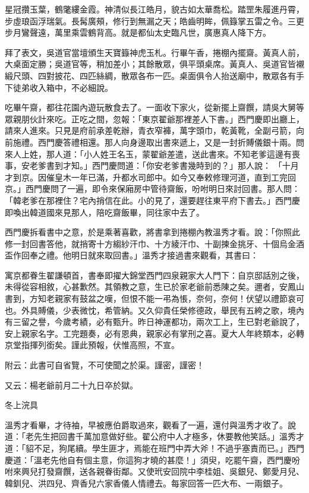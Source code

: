 星冠攢玉葉，鶴氅縷金霞。神清似長江皓月，貌古如太華喬松。踏罡朱履進丹霄，步虛琅函浮瑞氣。長髯廣頰，修行到無漏之天；皓齒明眸，佩籙掌五雷之令。三更步月鸞聲遠，萬里乘雲鶴背高。就是都仙太史臨凡世，廣惠真人降下方。

拜了表文，吳道官當壇頒生天寶籙神虎玉札。行畢午香，捲棚內擺齋。黃真人前，大桌面定勝；吳道官等，稍加差小；其餘散眾，俱平頭桌席。黃真人、吳道官皆襯緞尺頭、四對披花、四匹絲綢，散眾各布一匹。桌面俱令人抬送廟中，散眾各有手下徒弟收入箱中，不必細說。

吃畢午齋，都往花園內遊玩散食去了。一面收下家火，從新擺上齋饌，請吳大舅等眾親朋伙計來吃。正吃之間，忽報：「東京翟爺那裡差人下書。」西門慶即出廳上，請來人進來。只見是府前承差乾辦，青衣窄褲，萬字頭巾，乾黃靴，全副弓箭，向前施禮。西門慶答禮相還。那人向身邊取出書來遞上，又是一封折賻儀銀十兩。問來人上姓，那人道：「小人姓王名玉，蒙翟爺差遣，送此書來。不知老爹這邊有喪事，安老爹書到才知。」西門慶問道：「你安老爹書幾時到的？」那人說： 「十月才到京。因催皇木一年已滿，升都水司郎中。如今又奉敕修理河道，直到工完回京。」西門慶問了一遍，即令來保廂房中管待齋飯，吩咐明日來討回書。那人問：「韓老爹在那裡住？宅內捎信在此。小的見了，還要趕往東平府下書去。」西門慶即喚出韓道國來見那人，陪吃齋飯畢，同往家中去了。

西門慶拆看書中之意，於是乘著喜歡，將書拿到捲棚內教溫秀才看。說：「你照此修一封回書答他，就捎寄十方縐紗汗巾、十方綾汗巾、十副揀金挑牙、十個烏金酒盃作回奉之禮。他明日就來取回書。」溫秀才接過書來觀看，其書曰：

寓京都眷生翟謙頓首，書奉即擢大錦堂西門四泉親家大人門下：自京邸話別之後，未得從容相敘，心甚歉然。其領教之意，生已於家老爺前悉陳之矣。邇者，安鳳山書到，方知老親家有鼓盆之嘆，但恨不能一弔為悵，奈何，奈何！伏望以禮節哀可也。外具賻儀，少表微忱，希管納。又久仰貴任榮修德政，舉民有五絝之歌，境內有三留之譽，今歲考績，必有甄升。昨日神運都功，兩次工上，生已對老爺說了，安上親家名字。工完題奏，必有恩典，親家必有掌刑之喜。夏大人年終類本，必轉京堂指揮列銜矣。謹此預報，伏惟高照，不宣。

附云：此書可自省覽，不可使聞之於渠。謹密，謹密！

又云：楊老爺前月二十九日卒於獄。

冬上浣具

溫秀才看畢，才待袖，早被應伯爵取過來，觀看了一遍，還付與溫秀才收了。說道：「老先生把回書千萬加意做好些。翟公府中人才極多，休要教他笑話。」溫秀才道：「貂不足，狗尾續。學生匪才，焉能在班門中弄大斧！不過乎塞責而已。」西門慶道：「溫老先他自有個主意，你這狗才曉的甚麼！」須臾，吃罷午齋，西門慶吩咐來興兒打發齋饌，送各親眷街鄰。又使玳安回院中李桂姐、吳銀兒、鄭愛月兒、韓釧兒、洪四兒、齊香兒六家香儀人情禮去。每家回答一匹大布、一兩銀子。

